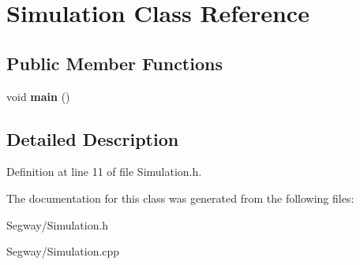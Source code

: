 \section{Simulation Class Reference}
\label{class_simulation}
\subsection*{Public Member Functions}
\begin{DoxyCompactItemize}
\item 
void {\bfseries main} ()\label{class_simulation_a4a4b336c6c2b8bd4ff51fffdef7bfc88}

\end{DoxyCompactItemize}


\subsection{Detailed Description}


Definition at line 11 of file Simulation.\+h.



The documentation for this class was generated from the following files\+:\begin{DoxyCompactItemize}
\item 
Segway/Simulation.\+h\item 
Segway/Simulation.\+cpp\end{DoxyCompactItemize}
